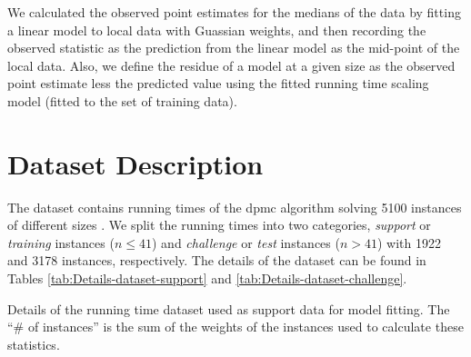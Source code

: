 We calculated the observed point estimates for the medians of the
data by fitting a linear model to local data with Guassian weights, and
then recording the observed statistic as the prediction from the linear
model as the mid-point of the local data.
Also, we define the residue of a model at a given size as the observed
point estimate less the
predicted value using the fitted running time scaling model (fitted to
the set of training data).


\section{Dataset Description}

The dataset contains running times of the dpmc algorithm solving
5100 instances of different sizes . We split the
running times into two categories, \emph{support} or \emph{training}
instances ($n\leq41$) and \emph{challenge} or
\emph{test} instances ($n>41$) with 1922
and 3178 instances, respectively. The
details of the dataset can be found in Tables \ref{tab:Details-dataset-support}
and \ref{tab:Details-dataset-challenge}.
\begin{table*}
\noindent \begin{centering}

\par\end{centering}

\caption{\label{tab:Details-dataset-support} Details of the running time
dataset used as support data for model fitting.
 The ``\# of instances'' is the
sum of the weights of the instances used to calculate these statistics.}
\end{table*}

